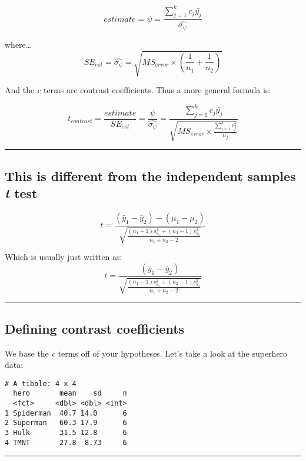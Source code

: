 \documentclass[]{article}
\begin{document}
\[estimate=\psi=\frac{\sum_{j=1}^kc_j\bar{y_j}}{\hat{\sigma_{\psi}}}\]

where\ldots{}
\[SE_{est}=\hat{\sigma_{\psi}}=\sqrt{MS_{error}\times{(\frac{1}{n_1}+\frac{1}{n_2})}}\]

And the \emph{c} terms are contrast coefficients. Thus a more general
formula is:

\[t_{contrast}=\frac{estimate}{SE_{est}}=\frac{\psi}{\hat{\sigma_{\psi}}}=\frac{\sum_{j=1}^kc_j\bar{y_j}}{\sqrt{MS_{error}\times{\frac{\sum_{j=1}^kc_j^2}{n_j}}}}\]

\begin{center}\rule{0.5\linewidth}{\linethickness}\end{center}

\hypertarget{this-is-different-from-the-independent-samples-t-test}{%
\subsection{\texorpdfstring{This is different from the independent
samples \emph{t}
test}{This is different from the independent samples t test}}\label{this-is-different-from-the-independent-samples-t-test}}

\[t=\frac{(\bar{y}_1-\bar{y}_2)-(\mu_1-\mu_2)}{\sqrt{\frac{(n_1-1)s_{y_1}^2+(n_2-1)s_{y_2}^2}{n_1+n_2-2}}}\]

Which is usually just written as:
\[t=\frac{(\bar{y}_1-\bar{y}_2)}{\sqrt{\frac{(n_1-1)s_{y_1}^2+(n_2-1)s_{y_2}^2}{n_1+n_2-2}}}\]

\begin{center}\rule{0.5\linewidth}{\linethickness}\end{center}

\hypertarget{defining-contrast-coefficients}{%
\subsection{Defining contrast
coefficients}\label{defining-contrast-coefficients}}

We base the \emph{c} terms off of your hypotheses. Let's take a look at
the superhero data:

\begin{verbatim}
# A tibble: 4 x 4
  hero       mean    sd     n
  <fct>     <dbl> <dbl> <int>
1 Spiderman  40.7 14.0      6
2 Superman   60.3 17.9      6
3 Hulk       31.5 12.8      6
4 TMNT       27.8  8.73     6
\end{verbatim}

\begin{center}\rule{0.5\linewidth}{\linethickness}\end{center}
\end{document}
